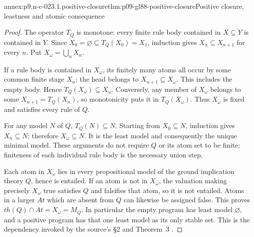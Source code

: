 
\begin{annexitem}{annex:p9.n-c-023.1.positive-closure}{thm:p09-gl88-positive-closure}{Positive closure, leastness and atomic consequence}
\begin{proof}
The operator \(T_Q\) is monotone: every finite rule body contained in
\(X\subseteq Y\) is contained in \(Y\).  Since
\(X_0=\varnothing\subseteq T_Q(X_0)=X_1\), induction gives
\(X_n\subseteq X_{n+1}\) for every \(n\).  Put
\(X_\omega=\bigcup_n X_n\).

If a rule body is contained in \(X_\omega\), its finitely many atoms all
occur by some common finite stage \(X_n\); the head belongs to
\(X_{n+1}\subseteq X_\omega\).  This includes the empty body.  Hence
\(T_Q(X_\omega)\subseteq X_\omega\).  Conversely, any member of
\(X_\omega\) belongs to some \(X_{n+1}=T_Q(X_n)\), so monotonicity puts
it in \(T_Q(X_\omega)\).  Thus \(X_\omega\) is fixed and satisfies every
rule of \(Q\).

For any model \(N\) of \(Q\), \(T_Q(N)\subseteq N\).  Starting from
\(X_0\subseteq N\), induction gives \(X_n\subseteq N\); therefore
\(X_\omega\subseteq N\).  It is the least model and consequently the unique
minimal model.  These arguments do not require \(Q\) or its atom set to be
finite; finiteness of each individual rule body is the necessary union step.

Each atom in \(X_\omega\) lies in every propositional model of the ground
implication theory \(Q\), hence is entailed.  If an atom is not in
\(X_\omega\), the valuation making precisely \(X_\omega\) true satisfies
\(Q\) and falsifies that atom, so it is not entailed.  Atoms in a larger
\(At\) which are absent from \(Q\) can likewise be assigned false.  This
proves \(th(Q)\cap At=X_\omega=M_Q\).  In particular the empty program
has least model \(\varnothing\), and a positive program has that one least
model as its only stable set.  This is the dependency invoked by the source's
\S2 and Theorem~3 \cite[pp.~4, 9]{GelfondLifschitz1988}.
\end{proof}
\end{annexitem}

